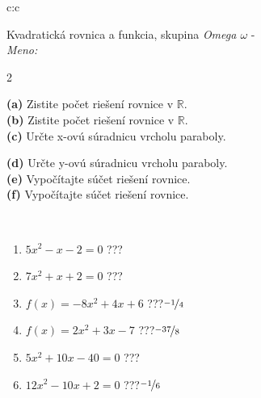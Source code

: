 \documentclass[10pt]{report}
\begin{document}
\begin{tabular}{c:c}
\begin{minipage}[c][104.5mm][t]{0.5\linewidth}
\begin{center}
\vspace{7mm}
{\huge {\LARGE Kvadratická rovnica a funkcia}, skupina \textit{Omega $\omega$} -}\\[5mm]
\textit{Meno:}\phantom{xxxxxxxxxxxxxxxxxxxxxxxxxxxxxxxxxxxxxxxxxxxxxxxxxxxxxxxxxxxxxxxxx}\\[5mm]
\begin{minipage}{0.95\linewidth}
\begin{center}
{\small \begin{multicols}{2} \raggedright
\textbf{(a)} Zistite počet riešení rovnice v \(\mathbb{R}\). \\[1mm]
\textbf{(b)} Zistite počet riešení rovnice v \(\mathbb{R}\). \\[1mm]
\textbf{(c)} Určte x-ovú súradnicu vrcholu paraboly. \par \columnbreak
\textbf{(d)} Určte y-ovú súradnicu vrcholu paraboly. \\[1mm]
\textbf{(e)} Vypočítajte súčet riešení rovnice. \\[1mm]
\textbf{(f)} Vypočítajte súčet riešení rovnice.
\end{multicols}
}
\end{center}
\end{minipage}
\\[4mm]
\begin{minipage}{0.79\linewidth}
\begin{center}
\begin{varwidth}{\linewidth}
\begin{enumerate}
\Large
\item $5x^2-x-2=0$\quad \dotfill\; ???\;\dotfill {}
\item $7x^2+x+2=0$\quad \dotfill\; ???\;\dotfill {}
\item $f(x)=-8x^2+4x+6$\quad \dotfill\; ???\;\dotfill \quad $\nicefrac{-1}{4}$
\item $f(x)=2x^2+3x-7$\quad \dotfill\; ???\;\dotfill \quad $\nicefrac{-37}{8}$
\item $5x^2+10x-40=0$\quad \dotfill\; ???\;\dotfill {}
\item $12x^2-10x+2=0$\quad \dotfill\; ???\;\dotfill \quad $\nicefrac{-1}{6}$
\end{enumerate}
\end{varwidth}
\end{center}

\end{minipage}
\end{center}
\end{minipage}
\end{tabular}
\end{document}
